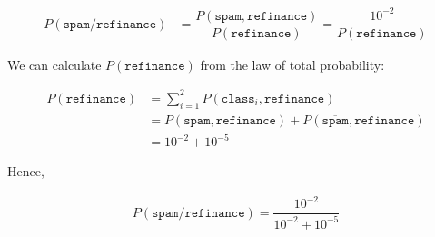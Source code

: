 \begin{align*}
  P(\texttt{spam} / \texttt{refinance}) &= \dfrac{P(\texttt{spam}, \texttt{refinance})}{P(\texttt{refinance})} = \dfrac{10^{-2}}{P(\texttt{refinance})}
\end{align*}

We can calculate $P(\texttt{refinance})$ from the law of total probability:

\begin{align*}
  P(\texttt{refinance}) &= \sum_{i=1}^{2} P(\texttt{class}_i, \texttt{refinance}) \\
                        &= P(\texttt{spam}, \texttt{refinance}) + P(\overline{\texttt{spam}}, \texttt{refinance}) \\
                        &= 10^{-2} + 10^{-5}
\end{align*}

Hence,

\begin{align*}
  P(\texttt{spam} / \texttt{refinance}) = \dfrac{10^{-2}}{10^{-2} + 10^{-5}}
\end{align*}
